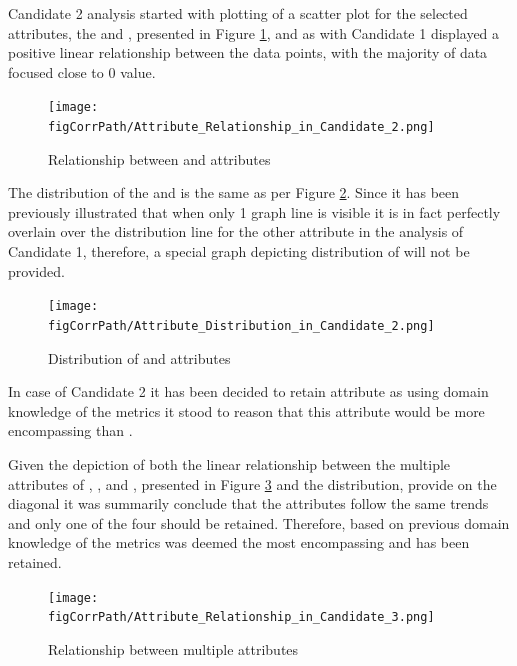 Candidate 2 analysis started with plotting of a scatter plot for the selected attributes, the \overallUncoveredLines{} and \uncoveredLines{}, presented in Figure \ref{fig:candidate2-scatterplot}, and as with Candidate 1 displayed a positive linear relationship between the data points, with the majority of data focused close to 0 value.

\begin{figure}[h!]
    \centering
    \texttt{[image: \\figCorrPath/Attribute\_Relationship\_in\_Candidate\_2.png]}
    \caption{Relationship between \overallUncoveredLines{} and \uncoveredLines{} attributes}
    \label{fig:candidate2-scatterplot}
\end{figure}

The distribution of the \overallUncoveredLines{} and \uncoveredLines{} is the same as per Figure \ref{fig:candidate2-distribution}. Since it has been previously illustrated that when only 1 graph line is visible it is in fact perfectly overlain over the distribution line for the other attribute in the analysis of Candidate 1, therefore, a special graph depicting distribution of \uncoveredLines{} will not be provided.
\begin{figure}
    \centering
  \texttt{[image: \\figCorrPath/Attribute\_Distribution\_in\_Candidate\_2.png]}
    \caption{Distribution of \overallUncoveredLines{} and \uncoveredLines{} attributes}
    \label{fig:candidate2-distribution}
\end{figure}
In case of Candidate 2 it  has been decided to retain \overallUncoveredLines{} attribute as using domain knowledge of the metrics it stood to reason that this attribute would be more encompassing than \uncoveredLines{}.
\FloatBarrier

Given the depiction of both the linear relationship between the multiple  attributes of \overallCoverage{}, \overallLineCoverage{},\coverage{} and \lineCoverage{}, presented in Figure \ref{fig:candidate3-pairplot} and the distribution, provide on the diagonal it was summarily conclude that the attributes follow the same trends and only one of the four should be retained. Therefore, based on previous domain knowledge of the metrics \overallCoverage{} was deemed the most encompassing and has been retained.
\begin{figure}[h!]
    \centering
    \texttt{[image: \\figCorrPath/Attribute\_Relationship\_in\_Candidate\_3.png]}
    \caption{Relationship between multiple attributes}
    \label{fig:candidate3-pairplot}
\end{figure}

